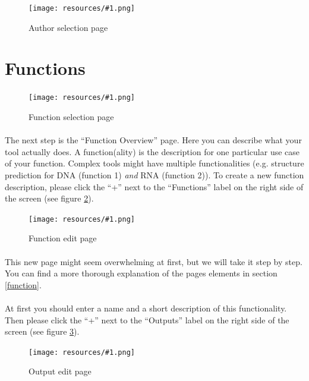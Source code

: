 \documentclass[a4paper,10pt]{book}
\newcommand{\bigpic}[1]{\texttt{[image: resources/\#1.png]}}
\begin{document}
\begin{figure}
 \bigpic{quickstart-authorSelection2}
\caption{Author selection page}
\label{quickstart-authorSelection2}
\end{figure}

\section{Functions}

\begin{figure}
 \bigpic{quickstart-functionSelection1}
\caption{Function selection page}
\label{quickstart-functionSelection1}
\end{figure}

\paragraph{} The next step is the ``Function Overview'' page. Here you can describe what your tool actually does. A function(ality) is the description for one particular use case of your function. Complex tools might have multiple functionalities (e.g. structure prediction for DNA (function 1) \textit{and} RNA (function 2)). To create a new function description, please click the ``+'' next to the ``Functions'' label on the right side of the screen (see figure \ref{quickstart-functionSelection1}).

\begin{figure}
 \bigpic{quickstart-function1}
\caption{Function edit page}
\label{quickstart-function1}
\end{figure}

\paragraph{} This new page might seem overwhelming at first, but we will take it step by step. You can find a more thorough explanation of the pages elements in section \ref{function}.
\paragraph{} At first you should enter a name and a short description of this functionality. Then please click the ``+'' next to the ``Outputs'' label on the right side of the screen (see figure \ref{quickstart-function1}).

\begin{figure}
 \bigpic{quickstart-output}
\caption{Output edit page}
\label{quickstart-output}
\end{figure}
\end{document}
